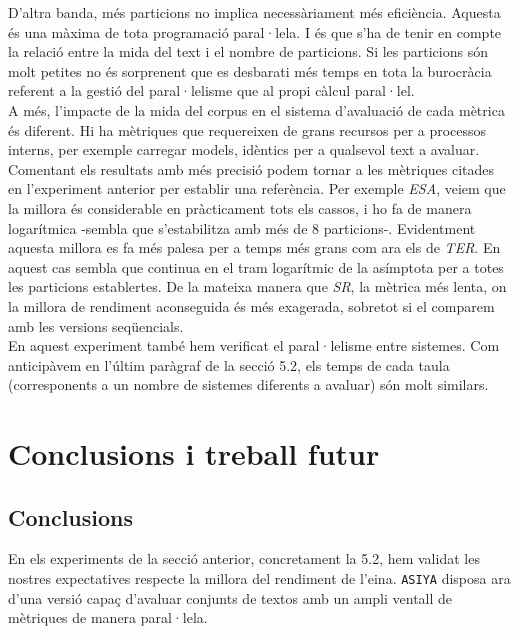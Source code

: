 \documentclass[11pt,a4paper]{article}
\begin{document}
D'altra banda, més particions no implica necessàriament més eficiència. Aquesta és una màxima de tota programació paral·lela. I és que s'ha de tenir en compte la relació entre la mida del text i el nombre de particions. Si les particions són molt petites no és sorprenent que es desbarati més temps en tota la burocràcia referent a la gestió del paral·lelisme que al propi càlcul paral·lel. 
\\

A més, l'impacte de la mida del corpus en el sistema d'avaluació de cada mètrica és diferent. Hi ha mètriques que requereixen de grans recursos per a processos interns, per exemple carregar models, idèntics per a qualsevol text a avaluar. 
\\

Comentant els resultats amb més precisió podem tornar a les mètriques citades en l'experiment anterior per establir una referència. Per exemple \textit{ESA}, veiem que la millora és considerable en pràcticament tots els cassos, i ho fa de manera logarítmica -sembla que s'estabilitza amb més de 8 particions-. Evidentment aquesta millora es fa més palesa per a temps més grans com ara els de \textit{TER}. En aquest cas sembla que continua en el tram logarítmic de la asímptota per a totes les particions establertes. De la mateixa manera que \textit{SR}, la mètrica més lenta, on la millora de rendiment aconseguida és més exagerada, sobretot si el comparem amb les versions seqüencials.
\\

En aquest experiment també hem verificat el paral·lelisme entre sistemes. Com anticipàvem en l'últim paràgraf de la secció 5.2, els temps de cada taula (corresponents a un nombre de sistemes diferents a avaluar) són molt similars.
 
\newpage
\section{Conclusions i treball futur}

\subsection{Conclusions}

En els experiments de la secció anterior, concretament la 5.2, hem validat les nostres expectatives respecte la millora del rendiment de l'eina. \texttt{ASIYA} disposa ara d'una versió capaç d'avaluar conjunts de textos amb un ampli ventall de mètriques de manera paral·lela. 
\\
\end{document}

